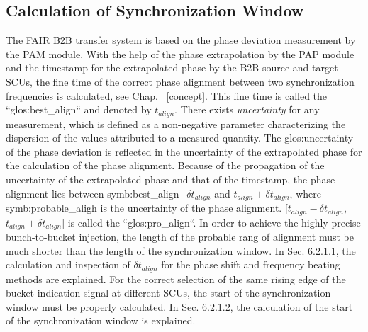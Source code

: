 \subsection{Calculation of Synchronization Window}
The FAIR B2B transfer system is based on the phase deviation measurement by the PAM module. With the help of the phase extrapolation by the PAP module and the timestamp for the extrapolated phase by the B2B source and target SCUs, the fine time of the correct phase alignment between two synchronization frequencies is calculated, see Chap. ~\ref{concept}. This fine time is called the ``\gls{glos:best_align}`` and denoted by $t_\mathit{align}$. There exists \textit{uncertainty} for any measurement, which is defined as a non-negative parameter characterizing the dispersion of the values attributed to a measured quantity. The \gls{glos:uncertainty}~\cite{taylor_introduction_1982} of the phase deviation is reflected in the uncertainty of the extrapolated phase for the calculation of the phase alignment.
Because of the propagation of the uncertainty of the extrapolated phase and that of the timestamp, the phase alignment lies between \gls{symb:best_align}$-\delta t_\mathit{align}$ and $t_\mathit{align}+\delta t_\mathit{align}$, where \gls{symb:probable_aligh} is the uncertainty of the phase alignment. [$t_\mathit{align}-\delta t_\mathit{align}$, $t_\mathit{align}+\delta t_\mathit{align}$] is called the ``\gls{glos:pro_align}``. In order to achieve the highly precise bunch-to-bucket injection, the length of the probable rang of alignment must be much shorter than the length of the synchronization window. In Sec. 6.2.1.1, the calculation and inspection of $\delta t_\mathit{align}$ for the phase shift and frequency beating methods are explained. For the correct selection of the same rising edge of the bucket indication signal at different SCUs, the start of the synchronization window must be properly calculated. In Sec. 6.2.1.2, the calculation of the start of the synchronization window is explained. 


